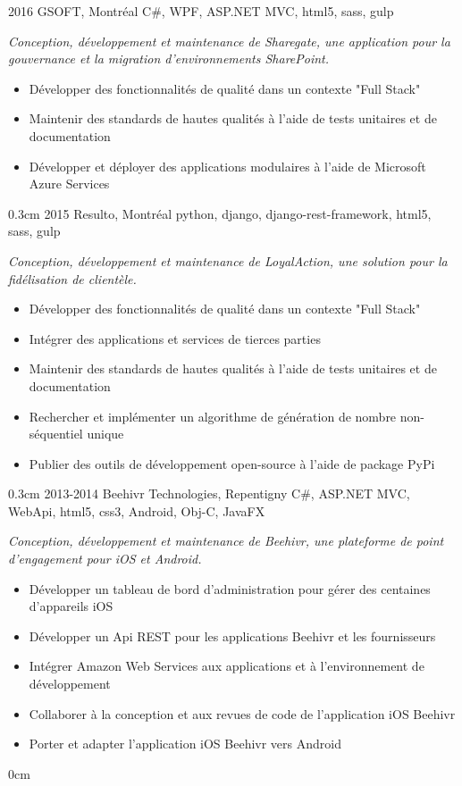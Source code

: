 \documentclass[]{friggeri-cv}
\begin{document}
\begin{entrylist}
  \entry
    {2016}
    {GSOFT, Montréal}
    {C\#, WPF, ASP.NET MVC, html5, sass, gulp}
    {\emph{Conception, développement et maintenance de Sharegate, une application pour la gouvernance et la migration d'environnements SharePoint.}
    \vspace{0.1cm}
    \begin{itemize}
      \item Développer des fonctionnalités de qualité dans un contexte "Full Stack"
      \item Maintenir des standards de hautes qualités à l'aide de tests unitaires et de documentation
      \item Développer et déployer des applications modulaires à l'aide de Microsoft Azure Services
    \end{itemize}}
    {0.3cm}
  \entry
    {2015}
    {Resulto, Montréal}
    {python, django, django-rest-framework, html5, sass, gulp}
    {\emph{Conception, développement et maintenance de LoyalAction, une solution pour la fidélisation de clientèle.}
    \vspace{0.1cm}
    \begin{itemize}
      \item Développer des fonctionnalités de qualité dans un contexte "Full Stack"
      \item Intégrer des applications et services de tierces parties
      \item Maintenir des standards de hautes qualités à l'aide de tests unitaires et de documentation
      \item Rechercher et implémenter un algorithme de génération de nombre non-séquentiel unique
      \item Publier des outils de développement open-source à l'aide de package PyPi
    \end{itemize}}
    {0.3cm}
  \entry
    {2013-2014}
    {Beehivr Technologies, Repentigny}
    {C\#, ASP.NET MVC, WebApi, html5, css3, Android, Obj-C, JavaFX}
    {\emph{Conception, développement et maintenance de Beehivr, une plateforme de point d'engagement pour iOS et Android.}
    \vspace{0.1cm}
    \begin{itemize}
      \item Développer un tableau de bord d'administration pour gérer des centaines d'appareils iOS
      \item Développer un Api REST pour les applications Beehivr et les fournisseurs
      \item Intégrer Amazon Web Services aux applications et à l'environnement de développement
      \item Collaborer à la conception et aux revues de code de l'application iOS Beehivr
      \item Porter et adapter l'application iOS Beehivr vers Android
    \end{itemize}}
    {0cm}
\end{entrylist}
\end{document}
